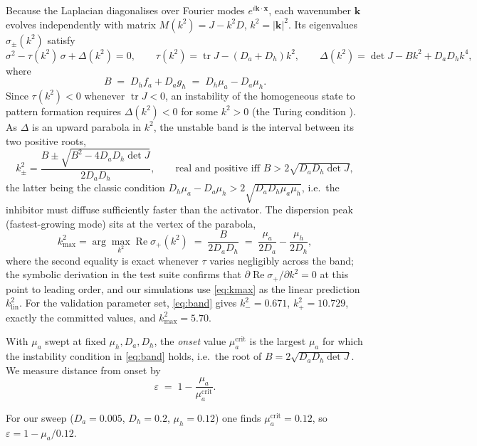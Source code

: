 Because the Laplacian diagonalises over Fourier modes $e^{i\mathbf{k}\cdot
\mathbf{x}}$, each wavenumber $\mathbf{k}$ evolves independently with
matrix $M(k^2) = J - k^2 D$, $k^2 = |\mathbf{k}|^2$. Its eigenvalues
$\sigma_\pm(k^2)$ satisfy
\begin{equation}
\sigma^2 - \tau(k^2)\,\sigma + \Delta(k^2) = 0, \qquad
\tau(k^2) = \operatorname{tr} J - (D_a + D_h) k^2, \qquad
\Delta(k^2) = \det J - B k^2 + D_a D_h k^4 ,
\label{eq:dispersion}
\end{equation}
where
\begin{equation}
B \;=\; D_h f_a + D_a g_h \;=\; D_h \mu_a - D_a \mu_h .
\label{eq:Bdef}
\end{equation}
Since $\tau(k^2) < 0$ whenever $\operatorname{tr} J < 0$, an instability of
the homogeneous state to pattern formation requires $\Delta(k^2) < 0$ for some
$k^2 > 0$ (the Turing condition \cite{turing1952}). As $\Delta$ is an upward
parabola in $k^2$, the unstable band is the interval between its two positive
roots,
\begin{equation}
k^2_{\pm} = \frac{B \pm \sqrt{B^2 - 4 D_a D_h \det J}}{2 D_a D_h},
\qquad\text{real and positive iff } B > 2\sqrt{D_a D_h \det J},
\label{eq:band}
\end{equation}
the latter being the classic condition $D_h \mu_a - D_a \mu_h >
2\sqrt{D_a D_h \mu_a \mu_h}$, i.e.\ the inhibitor must diffuse sufficiently
faster than the activator. The dispersion peak (fastest-growing mode) sits at
the vertex of the parabola,
\begin{equation}
k^2_{\max} = \arg\max_{k^2} \operatorname{Re}\sigma_{+}(k^2)
\;=\; \frac{B}{2 D_a D_h} \;=\; \frac{\mu_a}{2 D_a} - \frac{\mu_h}{2 D_h},
\label{eq:kmax}
\end{equation}
where the second equality is exact whenever $\tau$ varies negligibly across
the band; the symbolic derivation in the test suite confirms that
$\partial \operatorname{Re}\sigma_+ / \partial k^2 = 0$ at this point to
leading order, and our simulations use \eqref{eq:kmax} as the linear
prediction $k^2_{\mathrm{lin}}$. For the validation parameter set,
\eqref{eq:band} gives $k^2_- = 0.671$, $k^2_+ = 10.729$, exactly the committed
values, and $k^2_{\max} = 5.70$.

\begin{definition}
With $\mu_a$ swept at fixed $\mu_h, D_a, D_h$, the \emph{onset} value
$\mu_a^{\mathrm{crit}}$ is the largest $\mu_a$ for which the instability
condition in \eqref{eq:band} holds, i.e.\ the root of
$B = 2\sqrt{D_a D_h \det J}$. We measure distance from onset by
\begin{equation}
\varepsilon \;=\; 1 - \frac{\mu_a}{\mu_a^{\mathrm{crit}}}.
\label{eq:epsilon}
\end{equation}
\end{definition}
For our sweep ($D_a = 0.005$, $D_h = 0.2$, $\mu_h = 0.12$) one finds
$\mu_a^{\mathrm{crit}} = 0.12$, so $\varepsilon = 1 - \mu_a/0.12$.

